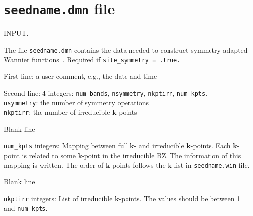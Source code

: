 %


\section{{\tt seedname.dmn} file} 

INPUT. 

The file \verb#seedname.dmn# contains the data needed to construct symmetry-adapted Wannier functions~\cite{sakuma-prb13}. 
Required if \verb#site_symmetry = .true.#

First line: a user comment, e.g., the date and time

Second line: 4 integers: \verb#num_bands#, \verb#nsymmetry#, \verb#nkptirr#, \verb#num_kpts#.  \\ 
\phantom{Second line:} \verb#nsymmetry#: the number of symmetry operations   \\
\phantom{Second line:}  \verb#nkptirr#: the number of irreducible ${\mathbf k}$-points

Blank line 

\verb#num_kpts# integers: 
Mapping between full $\mathbf  k$- and irreducible $\mathbf k$-points. 
Each $\mathbf k$-point is related to some $\mathbf k$-point in the irreducible BZ. 
The information of this mapping is written. 
The order of $\mathbf k$-points follows the $\mathbf k$-list in  \verb#seedname.win# file. 
 
Blank line 

\verb#nkptirr# integers:  
List of irreducible ${\mathbf k}$-points. The values should be between 1 and \verb#num_kpts#.

